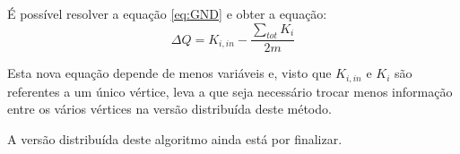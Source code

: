 É possível resolver a equação \ref{eq:GND} e obter a equação:
\begin{equation}
	\Delta Q  =  K_{i,in} - \frac{\sum_{tot} K_i}{2m}
\label{eq:GD}
\end{equation}


Esta nova equação depende de menos variáveis e, visto que $K_{i,in}$ e $K_i$ são referentes a um único vértice, leva a que seja necessário trocar menos informação entre os vários vértices na versão distribuída deste método.

A versão distribuída deste algoritmo ainda está por finalizar.

%


